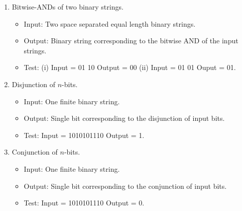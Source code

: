 \documentclass[11pt]{report}
\begin{document}
\begin{enumerate}
	\newpage
	\item Bitwise-ANDs of two binary strings. 

		\begin{itemize}
			\item[] Input: Two space separated equal length binary strings. 
			\item[] Output: Binary string corresponding to the bitwise AND of the input strings.
			\item[] Test: (i) Input = 01 10 Output = 00 (ii) Input = 01 01 Ouput = 01.
		\end{itemize}	

	\item Disjunction of $n$-bits. 

		\begin{itemize}
			\item[] Input: One finite binary string.
			\item[] Output: Single bit corresponding to the disjunction of input bits.
			\item[] Test: Input = 1010101110 Output = 1.
		\end{itemize}
	
	\item Conjunction of $n$-bits. 

		\begin{itemize}
			\item[] Input: One finite binary string. 
			\item[] Output: Single bit corresponding to the conjunction of input bits.
			\item[] Test: Input = 1010101110 Output = 0.
		\end{itemize}		
	 
\end{enumerate}
	
\end{document}
